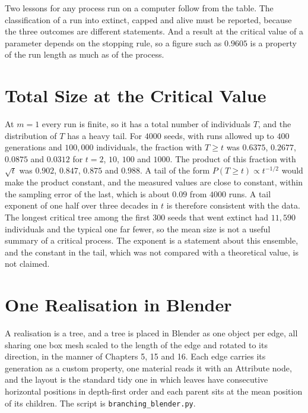 Two lessons for any process run on a computer follow from the table. The classification of a run into extinct, capped and alive must be reported, because the three outcomes are different statements. And a result at the critical value of a parameter depends on the stopping rule, so a figure such as $0.9605$ is a property of the run length as much as of the process.

\section{Total Size at the Critical Value}

At $m=1$ every run is finite, so it has a total number of individuals $T$, and the distribution of $T$ has a heavy tail. For $4000$ seeds, with runs allowed up to $400$ generations and $100{,}000$ individuals, the fraction with $T\ge t$ was $0.6375$, $0.2677$, $0.0875$ and $0.0312$ for $t=2$, $10$, $100$ and $1000$. The product of this fraction with $\sqrt t$ was $0.902$, $0.847$, $0.875$ and $0.988$. A tail of the form $P(T\ge t)\propto t^{-1/2}$ would make the product constant, and the measured values are close to constant, within the sampling error of the last, which is about $0.09$ from $4000$ runs. A tail exponent of one half over three decades in $t$ is therefore consistent with the data. The longest critical tree among the first $300$ seeds that went extinct had $11{,}590$ individuals and the typical one far fewer, so the mean size is not a useful summary of a critical process. The exponent is a statement about this ensemble, and the constant in the tail, which was not compared with a theoretical value, is not claimed.

\section{One Realisation in Blender}

A realisation is a tree, and a tree is placed in Blender as one object per edge, all sharing one box mesh scaled to the length of the edge and rotated to its direction, in the manner of Chapters 5, 15 and 16. Each edge carries its generation as a custom property, one material reads it with an Attribute node, and the layout is the standard tidy one in which leaves have consecutive horizontal positions in depth-first order and each parent sits at the mean position of its children. The script is \texttt{branching\_blender.py}.


